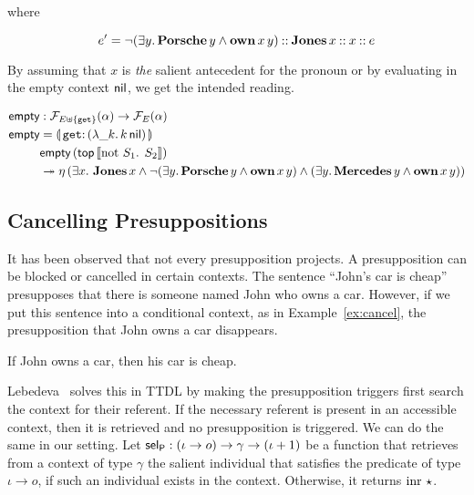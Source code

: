 where

$$
e' = \lnot (\exists y.\, \textbf{Porsche}\,y \land \textbf{own}\,x\,y) \mathbin{::}
     \textbf{Jones}\,x \mathbin{::} x \mathbin{::} e
$$

By assuming that $x$ is \emph{the} salient antecedent for the pronoun or by
evaluating in the empty context $\textsf{nil}$, we get the intended reading.

\begin{align*}
  \EMPTY &: \FF_{E \uplus \{\op{get}\}}(\alpha) \to \FF_E(\alpha) \\
  \EMPTY &= \banana{\onto{\op{get}}{(\lam{\_ k}{\ap{k}{\nil}})}} \\
  &\ap{\EMPTY}{(\ap{\TOP}{\sem{\text{not $S_1$. $S_2$}}})} \\
  &\tto \etaE{(\exists x.\
          \ap{\obj{Jones}}{x} \land
          \lnot (\exists y.\, \ap{\obj{Porsche}}{y} \land \app{\obj{own}}{x}{y}) \land
          (\exists y.\, \ap{\obj{Mercedes}}{y} \land \app{\obj{own}}{x}{y}))}
\end{align*}


\subsection{Cancelling Presuppositions}
\label{ssec:cancelling-presuppositions}

It has been observed that not every presupposition projects. A
presupposition can be blocked or cancelled in certain contexts. The
sentence ``John's car is cheap'' presupposes that there is someone named
John who owns a car. However, if we put this sentence into a conditional
context, as in Example~\ref{ex:cancel}, the presupposition that John owns a
car disappears.

\begin{exe}
  \ex \label{ex:cancel} If John owns a car, then his car is cheap.
\end{exe}

Lebedeva~\cite{lebedeva2012expression} solves this in TTDL by making the
presupposition triggers first search the context for their referent. If the
necessary referent is present in an accessible context, then it is
retrieved and no presupposition is triggered. We can do the same in our
setting. Let $\textsf{sel}_{\textsf{P}} : (\iota \to o) \to \gamma \to (\iota + 1)$ be a
function that retrieves from a context of type $\gamma$ the salient
individual that satisfies the predicate of type $\iota \to o$, if such an
individual exists in the context. Otherwise, it returns $\operatorname{inr}\,\star$.

